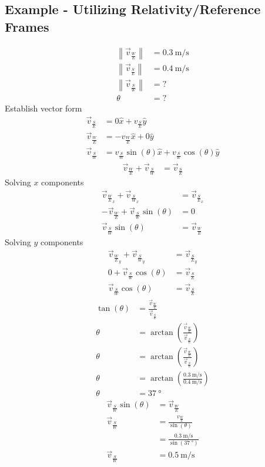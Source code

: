 \documentclass{article}
\begin{document}
\subsection{Example - Utilizing Relativity/Reference Frames}
\begin{align*}
	\left\| \vec{v}_\frac{W}{E} \right\| & = \SI{0.3}{\meter \per \second} \\
	\left\| \vec{v}_\frac{S}{E} \right\| & = \SI{0.4}{\meter \per \second} \\
	\left\| \vec{v}_\frac{S}{W} \right\| & = ? \\
	\theta & = ?
\end{align*}
Establish vector form
\begin{align*}
	\vec{v}_\frac{S}{E} & = 0 \hat{x} + v_\frac{S}{E}\hat{y} \\
	\vec{v}_\frac{W}{E} & = -v_\frac{W}{E}\hat{x} + 0\hat{y} \\
	\vec{v}_\frac{S}{W} & = v_\frac{S}{W}\sin(\theta)\hat{x} + v_\frac{S}{W}\cos(\theta)\hat{y}
\end{align*}
\begin{align*}
	\vec{v}_\frac{W}{E} + \vec{v}_\frac{S}{W} & = \vec{v}_\frac{S}{E}
\end{align*}
Solving $ x $ components
\begin{align*}
	\vec{v}_{\frac{W}{E}_x} + \vec{v}_{\frac{S}{W}_x} & = \vec{v}_{\frac{S}{E}_x} \\
	-\vec{v}_\frac{W}{E} + \vec{v}_\frac{S}{W}\sin(\theta) & = 0 \\
	\vec{v}_\frac{S}{W}\sin(\theta) & = \vec{v}_\frac{W}{E}
\end{align*}
Solving $ y $ components
\begin{align*}
	\vec{v}_{\frac{W}{E}_y} + \vec{v}_{\frac{S}{W}_y} & = \vec{v}_{\frac{S}{E}_y} \\
	0 + \vec{v}_\frac{S}{W}\cos(\theta) & = \vec{v}_\frac{S}{E} \\
	\vec{v}_\frac{S}{W}\cos(\theta) & = \vec{v}_\frac{S}{E}
\end{align*}
\begin{align*}
	\tan(\theta) & = \frac{\vec{v}_\frac{W}{E}}{\vec{v}_\frac{S}{E}} \\
	\theta & = \arctan \left( \frac{\vec{v}_\frac{W}{E}}{\vec{v}_\frac{S}{E}} \right) \\
	\theta & = \arctan \left( \frac{\vec{v}_\frac{W}{E}}{\vec{v}_\frac{S}{E}} \right) \\
	\theta & = \arctan \left( \frac{\SI{0.3}{\meter \per \second}}{\SI{0.4}{\meter \per \second}} \right) \\
	\theta & = \SI{37}{\degree}
\end{align*}
\begin{align*}
	\vec{v}_\frac{S}{W}\sin(\theta) & = \vec{v}_\frac{W}{E} \\
	\vec{v}_\frac{S}{W} & = \frac{v_\frac{W}{E}}{\sin(\theta)} \\
						& = \frac{\SI{0.3}{\meter \per \second}}{\sin(\SI{37}{\degree})} \\
	\vec{v}_\frac{S}{W} & = \SI{0.5}{\meter \per \second}
\end{align*}
\end{document}
